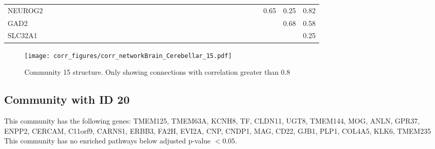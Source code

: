 \begin{longtable}{lrrrrrrrrrrrrrrrrrrrrrrrrrrrrrrrrr}
NEUROG2 &             &              &              &              &               &           &            &             &              &             &           &             &              &            &              &              &              &             &               &              &              &            &             &            &               &               &             &             &               &               &       0.65 &          0.25 &       0.82 \\
GAD2    &             &              &              &              &               &           &            &             &              &             &           &             &              &            &              &              &              &             &               &              &              &            &             &            &               &               &             &             &               &               &            &          0.68 &       0.58 \\
SLC32A1 &             &              &              &              &               &           &            &             &              &             &           &             &              &            &              &              &              &             &               &              &              &            &             &            &               &               &             &             &               &               &            &               &       0.25 \\
\end{longtable}


\begin{figure}[h!]
\centering
\texttt{[image: corr\_figures/corr\_networkBrain\_Cerebellar\_15.pdf]}
\caption{Community 15 structure. Only showing connections with correlation greater than 0.8}
\end{figure}




\subsection*{Community with ID 20}
This community has the following genes: TMEM125, TMEM63A, KCNH8, TF, CLDN11, UGT8, TMEM144, MOG, ANLN, GPR37, ENPP2, CERCAM, C11orf9, CARNS1, ERBB3, FA2H, EVI2A, CNP, CNDP1, MAG, CD22, GJB1, PLP1, COL4A5, KLK6, TMEM235
\\
This community has no enriched pathways below adjusted p-value $< 0.05$.

